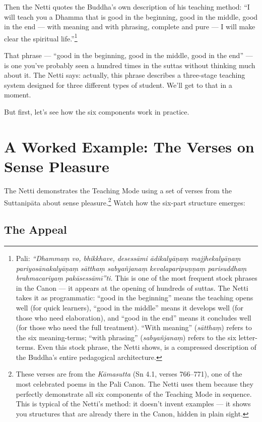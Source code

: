 Then the Netti quotes the Buddha's own description of his teaching method: ``I will teach you a Dhamma that is good in the beginning, good in the middle, good in the end --- with meaning and with phrasing, complete and pure --- I will make clear the spiritual life.''\footnote{Pali: \textit{``Dhammaṃ vo, bhikkhave, desessāmi ādikalyāṇaṃ majjhekalyāṇaṃ pariyosānakalyāṇaṃ sātthaṃ sabyañjanaṃ kevalaparipuṇṇaṃ parisuddhaṃ brahmacariyaṃ pakāsessāmī''ti.} This is one of the most frequent stock phrases in the Canon --- it appears at the opening of hundreds of suttas. The Netti takes it as programmatic: ``good in the beginning'' means the teaching opens well (for quick learners), ``good in the middle'' means it develops well (for those who need elaboration), and ``good in the end'' means it concludes well (for those who need the full treatment). ``With meaning'' (\textit{sātthaṃ}) refers to the six meaning-terms; ``with phrasing'' (\textit{sabyañjanaṃ}) refers to the six letter-terms. Even this stock phrase, the Netti shows, is a compressed description of the Buddha's entire pedagogical architecture.}

That phrase --- ``good in the beginning, good in the middle, good in the end'' --- is one you've probably seen a hundred times in the suttas without thinking much about it. The Netti says: actually, this phrase describes a three-stage teaching system designed for three different types of student. We'll get to that in a moment.

But first, let's see how the six components work in practice.

\section*{A Worked Example: The Verses on Sense Pleasure}

The Netti demonstrates the Teaching Mode using a set of verses from the Suttanipāta about sense pleasure.\footnote{These verses are from the \textit{Kāmasutta} (Sn 4.1, verses 766--771), one of the most celebrated poems in the Pali Canon. The Netti uses them because they perfectly demonstrate all six components of the Teaching Mode in sequence. This is typical of the Netti's method: it doesn't invent examples --- it shows you structures that are already there in the Canon, hidden in plain sight.} Watch how the six-part structure emerges:

\subsection*{The Appeal}

